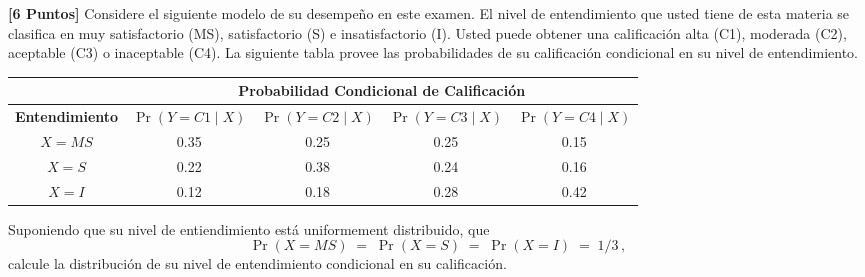 \documentclass[ a4paper, twoside, 11pt]{article}
\begin{document}
\begin{problem}
\textbf{[6 Puntos]} Considere el siguiente modelo de su desempe\~no en este examen. El nivel de entendimiento que usted tiene de esta materia se clasifica en muy satisfactorio (MS), satisfactorio (S) e insatisfactorio (I). Usted puede obtener una calificaci\'on alta (C1), moderada (C2), aceptable (C3) o inaceptable (C4). La siguiente tabla provee las probabilidades de su calificaci\'on condicional en su nivel de entendimiento. 

\begin{table}[htb]
\centering
\begin{tabular}{c|c|c|c|c|}
\cline{2-5}
 & \multicolumn{4}{c|}{\textbf{Probabilidad Condicional de Calificaci\'on}} \\ \hline
\multicolumn{1}{|c|}{\textbf{Entendimiento}} & $\Pr( Y=C1 \mid X)$ & $\Pr( Y=C2 \mid X)$ & $\Pr( Y=C3 \mid X)$ & $\Pr( Y=C4 \mid X)$ \\ \hline
\multicolumn{1}{|c|}{$X=MS$} & 0.35 & 0.25 & 0.25 & 0.15 \\ \hline
\multicolumn{1}{|c|}{$X=S$} & 0.22 & 0.38 & 0.24 & 0.16 \\ \hline
\multicolumn{1}{|c|}{$X=I$} & 0.12 & 0.18 & 0.28 & 0.42 \\ \hline
\end{tabular}
\end{table}

Suponiendo que su nivel de entiendimiento est\'a uniformement distribuido, \ie que
\[
\Pr(X=MS) \; = \; \Pr(X=S) \; = \; \Pr(X=I) \; = \; 1/3 \, ,
\]
calcule la distribuci\'on de su nivel de entendimiento condicional en su calificaci\'on. 

\end{problem}
\vspace{\baselineskip}
\end{document}
